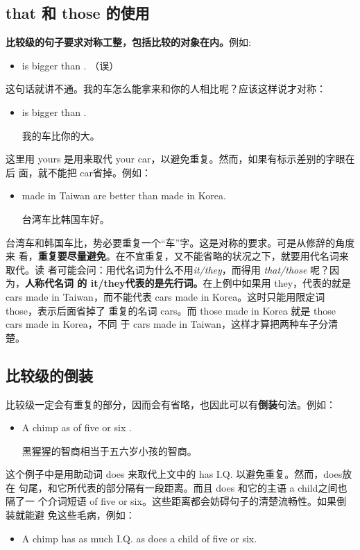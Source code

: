 \subsection{that 和 those 的使用}

\textbf{比较级的句子要求对称工整，包括比较的对象在内。}例如:
\begin{itemize}
\item  {} is bigger than . （误）
\end{itemize}
这句话就讲不通。我的车怎么能拿来和你的人相比呢？应该这样说才对称：
\begin{itemize}
\item  {} is bigger than .

  我的车比你的大。
\end{itemize}
这里用 yours 是用来取代 your car，以避免重复。然而，如果有标示差别的字眼在后
面，就不能把 car省掉。例如：
\begin{itemize}
\item  {} made in Taiwan are better than  made in Korea.

  台湾车比韩国车好。
\end{itemize}
台湾车和韩国车比，势必要重复一个“车”字。这是对称的要求。可是从修辞的角度来
看，\textbf{重复要尽量避免}。在不宜重复，又不能省略的状况之下，就要用代名词来取代。读
者可能会问：用代名词为什么不用\emph{it/they}，而得用 \emph{that/those} 呢？因为，\textbf{人称代名词
  的 it/they代表的是先行词。}在上例中如果用 they，代表的就是 cars made in
Taiwan，而不能代表 cars made in Korea。这时只能用限定词those，表示后面省掉了
重复的名词 cars。而 those made in Korea 就是 those cars made in Korea，不同
于 cars made in Taiwan，这样才算把两种车子分清楚。

\subsection{比较级的倒装}

比较级一定会有重复的部分，因而会有省略，也因此可以有\textbf{倒装}句法。例如：
\begin{itemize}
\item  A chimp  as  of five or six .

  黑猩猩的智商相当于五六岁小孩的智商。
\end{itemize}
这个例子中是用助动词 does 来取代上文中的 has I.Q. 以避免重复。然而，does放在
句尾，和它所代表的部分隔有一段距离。而且 does 和它的主语 a child之间也隔了一
个介词短语 of five or six。这些距离都会妨碍句子的清楚流畅性。如果倒装就能避
免这些毛病，例如：
\begin{itemize}
\item  A chimp has as much I.Q. as does a child of five or six.
\end{itemize}

